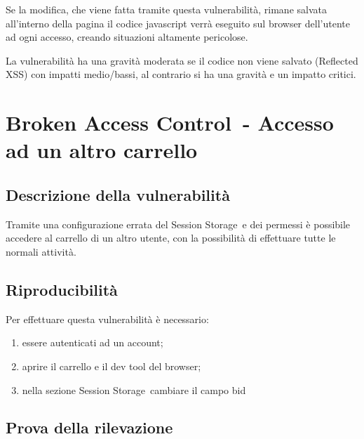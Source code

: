 \documentclass[
]{article}
\providecommand{\tightlist}{%
  \setlength{\itemsep}{0pt}\setlength{\parskip}{0pt}}
\begin{document}
{Se la modifica, che viene fatta tramite questa vulnerabilità, rimane
salvata all'interno della pagina il codice javascript verrà eseguito sul
browser dell'utente ad ogni accesso, creando situazioni altamente
pericolose.}

{}

{La vulnerabilità ha una gravità moderata se il codice non viene salvato
(}{Reflected XSS}{) con impatti medio/bassi, al contrario si ha una
gravità e un impatto critici.}

{}

\section{\texorpdfstring{{Broken Access }{Control}{~- Accesso ad un
altro
carrello}}{Broken Access Control~- Accesso ad un altro carrello}}\label{h.jtzze9vhb77t}

\subsection{\texorpdfstring{{Descrizione della
vulnerabilità}}{Descrizione della vulnerabilità}}\label{h.ymnlgohc8kto}

{Tramite una configurazione errata del }{Session Storage}{~e dei
permessi è possibile accedere al carrello di un altro utente, con la
possibilità di effettuare tutte le normali attività.}

\subsection{\texorpdfstring{{Riproducibilità}}{Riproducibilità}}\label{h.541z6ku05wnf}

{Per effettuare questa vulnerabilità è necessario:}

\begin{enumerate}
\tightlist
\item
  {essere autenticati ad un account;}
\item
  {aprire il carrello e il dev tool del browser;}
\item
  {nella sezione }{Session Storage}{~cambiare il campo }{bid}
\end{enumerate}

\subsection{\texorpdfstring{{Prova della
rilevazione}}{Prova della rilevazione}}\label{h.vmjkki6ithr3}
\end{document}
